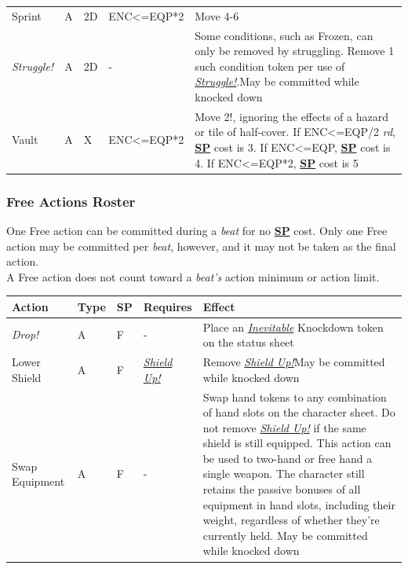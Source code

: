 \documentclass[12pt]{article}
\newcommand{\refto}[1]{\hyperlink{#1}{\textbf{#1}}}
\newcommand{\reftoit}[1]{\hyperlink{#1}{\emph{#1}}}
\begin{document}
\begin{center}
\begin{tabularx}{\textwidth}{p{}p{}p{}p{}p{}}
Sprint & A & 2D & ENC<=EQP*2 & Move 4-6\\
\emph{Struggle!}\hypertarget{Struggle!}{} & A & 2D & - & Some conditions, such as Frozen, can only be removed by struggling. Remove 1 such condition token per use of \reftoit{Struggle!}.\newline May be committed while knocked down\\
Vault & A & X & ENC<=EQP*2 & Move 2!, ignoring the effects of a hazard or tile of half-cover.\newline
If ENC<=EQP/2 \emph{rd}, \refto{SP} cost is 3.\newline
If ENC<=EQP, \refto{SP} cost is 4.\newline
If ENC<=EQP*2, \refto{SP} cost is 5\\
\hline
\end{tabularx}
\end{center}

\pagebreak

\subsubsection{Free Actions Roster}
One Free action can be committed during a \emph{beat} for no \refto{SP} cost. Only one Free action may be committed per \emph{beat}, however, and it may not be taken as the final action.\\
A Free action does not count toward a \emph{beat’s} action minimum or action limit.\\
\begin{center}
\begin{tabularx}{\textwidth}{p{}p{}p{}p{}p{}}
\hline
\rowcolor{white} \textbf{Action} & \textbf{Type} & \textbf{SP} & \textbf{Requires} & \textbf{Effect}\setcounter{rownum}{0}\\
\hline
\emph{Drop!} & A & F & - & Place an \reftoit{Inevitable} Knockdown token on the status sheet\\
Lower Shield & A & F & \reftoit{Shield Up!} & Remove \reftoit{Shield Up!}\newline May be committed while knocked down\\
Swap Equipment & A & F & - & Swap hand tokens to any combination of hand slots on the character sheet.\newline
Do not remove \reftoit{Shield Up!} if the same shield is still equipped.\newline
This action can be used to two-hand or free hand a single weapon.\newline
The character still retains the passive bonuses of all equipment in hand slots, including their weight, regardless of whether they’re currently held.\newline
May be committed while knocked down\\
\hline
\end{tabularx}
\end{center}
\end{document}
